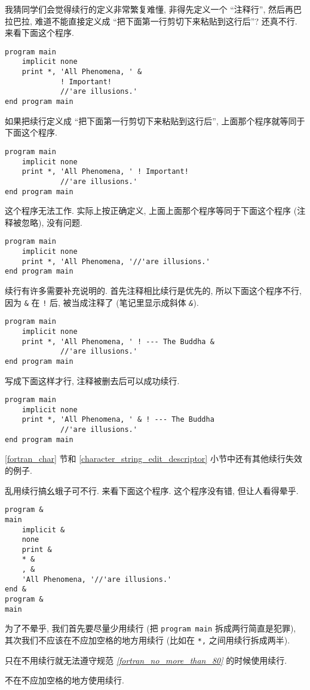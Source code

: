 我猜同学们会觉得续行的定义非常繁复难懂, 非得先定义一个 ``注释行'', 然后再巴拉巴拉, 难道不能直接定义成 ``把下面第一行剪切下来粘贴到这行后''? 还真不行. 来看下面这个程序.
\begin{lstlisting}
program main
    implicit none
    print *, 'All Phenomena, ' &
             ! Important!
             //'are illusions.'
end program main
\end{lstlisting}
如果把续行定义成 ``把下面第一行剪切下来粘贴到这行后'', 上面那个程序就等同于下面这个程序.
\begin{lstlisting}
program main
    implicit none
    print *, 'All Phenomena, ' ! Important!
             //'are illusions.'
end program main
\end{lstlisting}
这个程序无法工作. 实际上按正确定义, 上面上面那个程序等同于下面这个程序 (注释被忽略), 没有问题.
\begin{lstlisting}
program main
    implicit none
    print *, 'All Phenomena, '//'are illusions.'
end program main
\end{lstlisting}

续行有许多需要补充说明的. 首先注释相比续行是优先的, 所以下面这个程序不行, 因为 \texttt{\&{}} 在 \texttt{!} 后, 被当成注释了 (笔记里显示成斜体 \emph{\texttt{\&{}}}).
\begin{lstlisting}
program main
    implicit none
    print *, 'All Phenomena, ' ! --- The Buddha &
             //'are illusions.'
end program main
\end{lstlisting}
写成下面这样才行, 注释被删去后可以成功续行.
\begin{lstlisting}
program main
    implicit none
    print *, 'All Phenomena, ' & ! --- The Buddha
             //'are illusions.'
end program main
\end{lstlisting}
\ref{fortran_char} 节和 \ref{character_string_edit_descriptor} 小节中还有其他续行失效的例子.

乱用续行搞幺蛾子可不行. 来看下面这个程序. 这个程序没有错, 但让人看得晕乎.
\begin{lstlisting}
program &
main
    implicit &
    none
    print &
    * &
    , & 
    'All Phenomena, '//'are illusions.'
end &
program &
main
\end{lstlisting}
为了不晕乎, 我们首先要尽量少用续行 (把 \texttt{program main} 拆成两行简直是犯罪), 其次我们不应该在不应加空格的地方用续行 (比如在 \texttt{*,} 之间用续行拆成两半).
\begin{convention}
    只在不用续行就无法遵守规范 \emph{\ref{fortran_no_more_than_80}} 的时候使用续行.
\end{convention}
\begin{convention}
    不在不应加空格的地方使用续行.
\end{convention}

